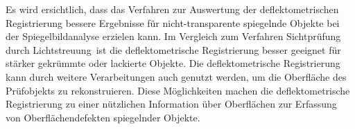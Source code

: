 \p
Es wird ersichtlich, dass das Verfahren zur Auswertung der deflektometrischen Registrierung bessere Ergebnisse für nicht-transparente spiegelnde Objekte bei der Spiegelbildanalyse erzielen kann.
Im Vergleich zum Verfahren \glqq Sichtprüfung durch Lichtstreuung\grqq ~ist die deflektometrische Registrierung besser geeignet für stärker gekrümmte oder lackierte Objekte.
Die deflektometrische Registrierung kann durch weitere Verarbeitungen auch genutzt werden, um die Oberfläche des Prüfobjekts zu rekonstruieren.
Diese Möglichkeiten machen die deflektometrische Registrierung zu einer nützlichen Information über Oberflächen zur Erfassung von Oberflächendefekten spiegelnder Objekte.